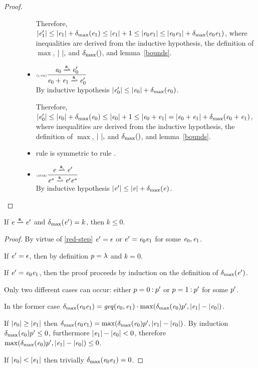 \begin{proof}
\begin{description}
\begin{itemize}
          Therefore, ${\mid}{\mathit {e}_1'}{\mid}\leq {\mid}{\ensuremath{\mathit {e}}_1}{\mid}+{\delta_{\max}}({\mathit {e}_1})\leq{\mid}{\ensuremath{\mathit {e}}_1}{\mid}+1\leq{\mid}{\ensuremath{\mathit {e}}_0\ensuremath{\mathit {e}}_1}{\mid}\leq{\mid}{\ensuremath{\mathit {e}}_0\ensuremath{\mathit {e}}_1}{\mid}+{\delta_{\max}}({\mathit {e}_0\mathit {e}_1})$, where inequalities are derived from the inductive hypothesis, the definition of $\max$, ${\mid}{\ }{\mid},$ and ${\delta_{\max}}({})$, and lemma~\ref{bounds}.

    \item $\Rule{l-or}{\re_0\parDer{\sym}\re'_0}{\re_0\orop\re_1\parDer{\sym}\re'_0}{}$\\[2ex]
          By inductive hypothesis ${\mid}{\mathit {e}_0'}{\mid}\leq {\mid}{\ensuremath{\mathit {e}}_0}{\mid}+{\delta_{\max}}({\mathit {e}_0})$.

          Therefore, ${\mid}{\mathit {e}_0'}{\mid}\leq {\mid}{\ensuremath{\mathit {e}}_0}{\mid}+{\delta_{\max}}({\mathit {e}_0})\leq{\mid}{\ensuremath{\mathit {e}}_0}{\mid}+1\leq{\mid}{\ensuremath{\mathit {e}}_0\mathbin{+}\ensuremath{\mathit {e}}_1}{\mid}={\mid}{\mathit {e}_0\mathbin{+}\mathit {e}_1}{\mid}+{\delta_{\max}}({\mathit {e}_0\mathbin{+}\mathit {e}_1})$, where inequalities are derived from the inductive hypothesis, the definition of $\max$, ${\mid}{\ }{\mid},$ and ${\delta_{\max}}({})$, and lemma~\ref{bounds}.
    \item rule  is symmetric to  rule .
    \item $\Rule{star}{\re\parDer{\sym}\re'}{\starop{\re}\parDer{\sym}\re'\starop{\re}}{}$\\[2ex]
          By inductive hypothesis ${\mid}{\mathit {e}'}{\mid}\leq {\mid}{\ensuremath{\mathit {e}}}{\mid}+{\delta_{\max}}({\mathit {e}})$.

   \end{itemize}
 \end{description}
\end{proof}

\begin{theorem}\label{zero-inc}
 If $\re\parDer{\sym}{}\re'$ and ${\delta_{\max}}({\mathit {e}'})=k$, then $k\leq 0$.
 \begin{proof}
  By virtue of \cref{red-step} $\mathit {e}'=\mathtt {\epsilon}$ or $\mathit {e}'=\mathit {e}_0\mathit {e}_1$ for some $\mathit {e}_0,\mathit {e}_1$.

  If $\mathit {e}'=\mathtt {\epsilon}$, then by definition $p=\lambda$ and $k=0$.

  If $\mathit {e}'=\mathit {e}_0\mathit {e}_1$, then the proof proceeds by induction on the definition of ${\delta_{\max}}({\mathit {e}'})$.

  Only two different cases can occur: either $p=0\mathbin{:}p'$ or $p=1\mathbin{:}p'$ for some  $p'$.

  In the former case ${\delta_{\max}}({\mathit {e}_0\mathit {e}_1})=\mathit{geq}({\mathit {e}_0},{\mathit {e}_1})\cdot\max({\delta_{\max}}({\mathit {e}_0}){p'},{\mid}{\mathit {e}_1}{\mid}-{\mid}{\mathit {e}_0}{\mid})$.

  If ${\mid}{\mathit {e}_0}{\mid}\geq{\mid}{\ensuremath{\mathit {e}}_1}{\mid}$ then ${\delta_{\max}}({\mathit {e}_0\mathit {e}_1})=\max({\delta_{\max}}({\mathit {e}_0}){p'},{\mid}{\mathit {e}_1}{\mid}-{\mid}{\mathit {e}_0}{\mid})$.
  By induction ${\delta_{\max}}({\mathit {e}_0}){p'}\leq 0$, furthermore ${\mid}{\mathit {e}_1}{\mid}-{\mid}{\mathit {e}_0}{\mid}<0$, therefore $\max({\delta_{\max}}({\mathit {e}_0}){p'},{\mid}{\mathit {e}_1}{\mid}-{\mid}{\mathit {e}_0}{\mid})\leq 0$.

  If ${\mid}{\mathit {e}_0}{\mid}<{\mid}{\mathit {e}_1}{\mid}$ then trivially ${\delta_{\max}}({\mathit {e}_0\mathit {e}_1})=0$.


 \end{proof}
\end{theorem}
